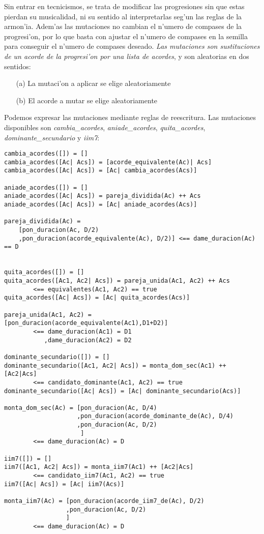 \begin{enumerate}
        Sin entrar en tecnicismos, se trata de modificar las progresiones sin que estas pierdan su musicalidad, ni su sentido al interpretarlas seg'un las reglas de la armon'ia. Adem'as las mutaciones no cambian el n'umero de compases de la progresi'on, por lo que basta con ajustar el n'umero de compases en la semilla para conseguir el n'umero de compases deseado.
\newline
\newline
        \emph{Las mutaciones son sustituciones de un acorde de la progresi'on por una lista de acordes}, y son aleatorias en dos sentidos:
                \begin{enumerate}
                \item[(a)] La mutaci'on a aplicar se elige aleatoriamente
                \item[(b)] El acorde a mutar se elige aleatoriamente
                \end{enumerate}

        Podemos expresar las mutaciones mediante reglas de reescritura. Las mutaciones disponibles son \emph{cambia\_acordes}, \emph{aniade\_acordes}, \emph{quita\_acordes}, \emph{dominante\_secundario} y \emph{iim7}:

        \begin{verbatim}
cambia_acordes([]) = []
cambia_acordes([Ac| Acs]) = [acorde_equivalente(Ac)| Acs]
cambia_acordes([Ac| Acs]) = [Ac| cambia_acordes(Acs)]

aniade_acordes([]) = []
aniade_acordes([Ac| Acs]) = pareja_dividida(Ac) ++ Acs
aniade_acordes([Ac| Acs]) = [Ac| aniade_acordes(Acs)]

pareja_dividida(Ac) =  
    [pon_duracion(Ac, D/2)
    ,pon_duracion(acorde_equivalente(Ac), D/2)] <== dame_duracion(Ac) == D


quita_acordes([]) = []
quita_acordes([Ac1, Ac2| Acs]) = pareja_unida(Ac1, Ac2) ++ Acs
        <== equivalentes(Ac1, Ac2) == true
quita_acordes([Ac| Acs]) = [Ac| quita_acordes(Acs)]

pareja_unida(Ac1, Ac2) =  [pon_duracion(acorde_equivalente(Ac1),D1+D2)] 
        <== dame_duracion(Ac1) = D1
           ,dame_duracion(Ac2) = D2

dominante_secundario([]) = []
dominante_secundario([Ac1, Ac2| Acs]) = monta_dom_sec(Ac1) ++ [Ac2|Acs]
        <== candidato_dominante(Ac1, Ac2) == true
dominante_secundario([Ac| Acs]) = [Ac| dominante_secundario(Acs)]

monta_dom_sec(Ac) = [pon_duracion(Ac, D/4)
                    ,pon_duracion(acorde_dominante_de(Ac), D/4)
                    ,pon_duracion(Ac, D/2)
                     ]
        <== dame_duracion(Ac) = D

iim7([]) = []
iim7([Ac1, Ac2| Acs]) = monta_iim7(Ac1) ++ [Ac2|Acs]
        <== candidato_iim7(Ac1, Ac2) == true
iim7([Ac| Acs]) = [Ac| iim7(Acs)]

monta_iim7(Ac) = [pon_duracion(acorde_iim7_de(Ac), D/2)
                 ,pon_duracion(Ac, D/2)
                 ]
        <== dame_duracion(Ac) = D
        \end{verbatim}
        
\end{enumerate}




